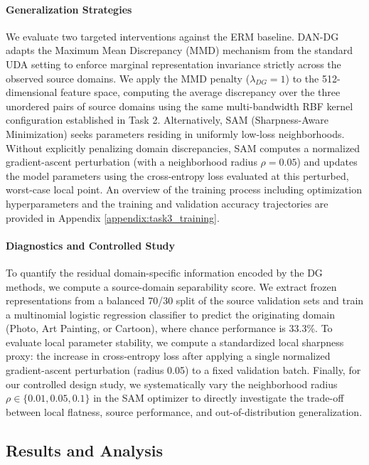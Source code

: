 \documentclass{article}
\begin{document}
\paragraph{Generalization Strategies}
We evaluate two targeted interventions against the ERM baseline. DAN-DG adapts the Maximum Mean Discrepancy (MMD) mechanism from the standard UDA setting \citep{pmlr-v37-long15} to enforce marginal representation invariance strictly across the observed source domains. We apply the MMD penalty ($\lambda_{DG}=1$) to the 512-dimensional feature space, computing the average discrepancy over the three unordered pairs of source domains using the same multi-bandwidth RBF kernel configuration established in Task 2. Alternatively, SAM (Sharpness-Aware Minimization) \citep{foret2021sharpnessaware} seeks parameters residing in uniformly low-loss neighborhoods. Without explicitly penalizing domain discrepancies, SAM computes a normalized gradient-ascent perturbation (with a neighborhood radius $\rho=0.05$) and updates the model parameters using the cross-entropy loss evaluated at this perturbed, worst-case local point. An overview of the training process including optimization hyperparameters and the training and validation accuracy trajectories are provided in Appendix \ref{appendix:task3_training}.


\paragraph{Diagnostics and Controlled Study}
To quantify the residual domain-specific information encoded by the DG methods, we compute a source-domain separability score. We extract frozen representations from a balanced 70/30 split of the source validation sets and train a multinomial logistic regression classifier to predict the originating domain (Photo, Art Painting, or Cartoon), where chance performance is 33.3\%. To evaluate local parameter stability, we compute a standardized local sharpness proxy: the increase in cross-entropy loss after applying a single normalized gradient-ascent perturbation (radius 0.05) to a fixed validation batch. Finally, for our controlled design study, we systematically vary the neighborhood radius $\rho \in \{0.01, 0.05, 0.1\}$ in the SAM optimizer to directly investigate the trade-off between local flatness, source performance, and out-of-distribution generalization.

\subsection{Results and Analysis}
\end{document}
